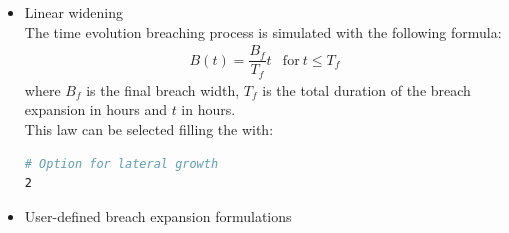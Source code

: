\begin{itemize}
\item Linear widening \\
The time evolution breaching process is simulated with the following formula:
\begin{equation}
\begin{array}{lc}
B(t)=\dfrac{B_f}{T_f}t & \text{for}~t\leq T_f
\end{array}
\end{equation}
where $B_f$ is the final breach width, $T_f$ is the total duration of the breach
expansion in hours and $t$ in hours. \\
This law can be selected filling the  with:
\begin{lstlisting}[language=bash]
# Option for lateral growth
2
\end{lstlisting}

\item User-defined breach expansion formulations


\end{itemize}
